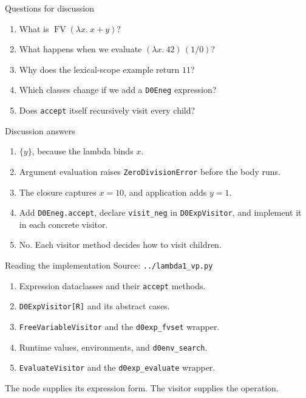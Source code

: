 \documentclass[aspectratio=169,11pt]{beamer}
\newcommand{\code}[1]{\texttt{#1}}
\begin{document}
\begin{frame}{Questions for discussion}
\begin{enumerate}
\item What is $\operatorname{FV}(\lambda x.\ x+y)$?
\medskip
\item What happens when we evaluate $(\lambda x.\ 42)\,(1/0)$?
\medskip
\item Why does the lexical-scope example return $11$?
\medskip
\item Which classes change if we add a \code{D0Eneg} expression?
\medskip
\item Does \code{accept} itself recursively visit every child?
\end{enumerate}
\end{frame}

\begin{frame}{Discussion answers}
\begin{enumerate}
\item $\{y\}$, because the lambda binds $x$.
\medskip
\item Argument evaluation raises \code{ZeroDivisionError} before the body runs.
\medskip
\item The closure captures $x=10$, and application adds $y=1$.
\medskip
\item Add \code{D0Eneg.accept}, declare \code{visit\_neg} in \code{D0ExpVisitor}, and implement it in each concrete visitor.
\medskip
\item No. Each visitor method decides how to visit children.
\end{enumerate}
\end{frame}

\begin{frame}{Reading the implementation}
Source: \code{../lambda1\_vp.py}
\begin{enumerate}
\item Expression dataclasses and their \code{accept} methods.
\item \code{D0ExpVisitor[R]} and its abstract cases.
\item \code{FreeVariableVisitor} and the \code{d0exp\_fvset} wrapper.
\item Runtime values, environments, and \code{d0env\_search}.
\item \code{EvaluateVisitor} and the \code{d0exp\_evaluate} wrapper.
\end{enumerate}
\medskip
The node supplies its expression form. The visitor supplies the operation.
\end{frame}
\end{document}
